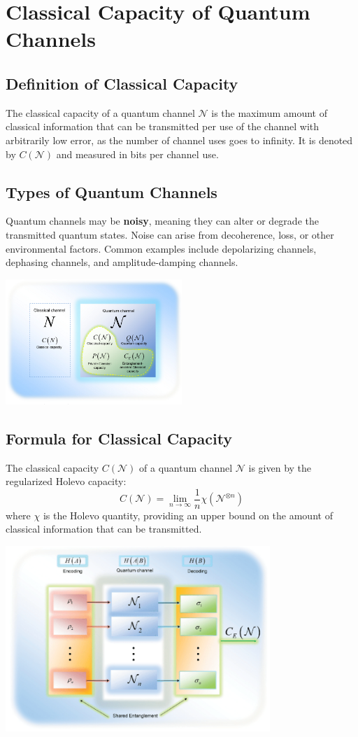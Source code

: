 \section{Classical Capacity of Quantum Channels}

\subsection{Definition of Classical Capacity}
The classical capacity of a quantum channel \( \mathcal{N} \) is the maximum amount of classical information that can be transmitted per use of the channel with arbitrarily low error, as the number of channel uses goes to infinity. It is denoted by \( C(\mathcal{N}) \) and measured in bits per channel use.

\subsection{Types of Quantum Channels}
Quantum channels may be \textbf{noisy}, meaning they can alter or degrade the transmitted quantum states. Noise can arise from decoherence, loss, or other environmental factors. Common examples include depolarizing channels, dephasing channels, and amplitude-damping channels.

\begin{center}
    \includegraphics[width=0.5\textwidth]{figures/properties_channels.png}
\end{center}

\subsection{Formula for Classical Capacity}
The classical capacity \( C(\mathcal{N}) \) of a quantum channel \( \mathcal{N} \) is given by the regularized Holevo capacity:
\begin{equation}
    C(\mathcal{N}) = \lim_{n \to \infty} \frac{1}{n} \chi\left(\mathcal{N}^{\otimes n}\right)
\end{equation}
where \( \chi \) is the Holevo quantity, providing an upper bound on the amount of classical information that can be transmitted.

\begin{center}
    \includegraphics[width=0.75\textwidth]{figures/classical_cap.png}
\end{center}
